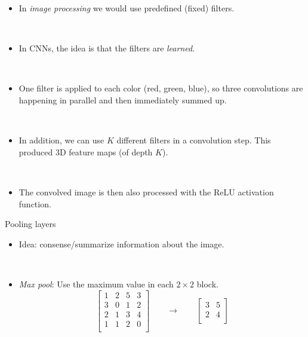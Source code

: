 \documentclass[
  10pt,
  ignorenonframetext,
]{beamer}
\providecommand{\tightlist}{%
  \setlength{\itemsep}{0pt}\setlength{\parskip}{0pt}}
\begin{document}
\begin{frame}
\begin{itemize}
\tightlist
\item
  In \emph{image processing} we would use predefined (fixed) filters.
\end{itemize}

\(~\)

\begin{itemize}
\tightlist
\item
  In CNNs, the idea is that the filters are \emph{learned}.
\end{itemize}

\(~\)

\begin{itemize}
\tightlist
\item
  One filter is applied to each color (red, green, blue), so three
  convolutions are happening in parallel and then immediately summed up.
\end{itemize}

\(~\)

\begin{itemize}
\tightlist
\item
  In addition, we can use \(K\) different filters in a convolution step.
  This produced 3D feature maps (of depth \(K\)).
\end{itemize}

\(~\)

\begin{itemize}
\tightlist
\item
  The convolved image is then also processed with the ReLU activation
  function.
\end{itemize}
\end{frame}

\begin{frame}
\begin{block}{Pooling layers}
\protect\hypertarget{pooling-layers}{}
\(~\)

\begin{itemize}
\tightlist
\item
  Idea: consense/summarize information about the image.
\end{itemize}

\(~\)

\begin{itemize}
\tightlist
\item
  \emph{Max pool}: Use the maximum value in each \(2\times 2\) block.
  \[\left[ 
  \begin{matrix}
  1 & 2 & 5 & 3 \\
  3 & 0 & 1 & 2 \\
  2 & 1 & 3 & 4\\
  1 & 1 & 2 & 0 \\
  \end{matrix}
  \right] \qquad \rightarrow \qquad 
  \left[ 
  \begin{matrix}
  3 & 5 \\
  2 & 4 \\
  \end{matrix}\right] \]
\end{itemize}
\end{block}
\end{frame}
\end{document}
